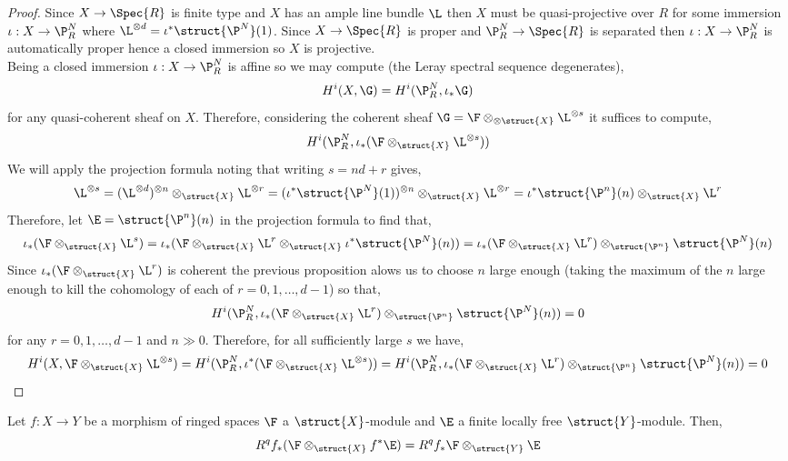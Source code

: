 \documentclass[12pt]{article}
\begin{document}
\begin{proof}
Since $X \to \Spec{R}$ is finite type and $X$ has an ample line bundle $\L$ then $X$ must be quasi-projective over $R$ for some immersion $\iota : X \to \P^N_R$ where $\L^{\otimes d} = \iota^* \struct{\P^N}(1)$. Since $X \to \Spec{R}$ is proper and $\P^N_R \to \Spec{R}$ is separated then $\iota : X \to \P^N_R$ is automatically proper hence a closed immersion so $X$ is projective. 
\bigskip\\
Being a closed immersion $\iota : X \to \P^N_R$ is affine so we may compute (the Leray spectral sequence degenerates),
\[ H^i(X, \G) = H^i(\P^N_R, \iota_* \G) \]
for any quasi-coherent sheaf on $X$. Therefore, considering the coherent sheaf $\G = \F \otimes_{\otimes{\struct{X}}} \L^{\otimes s}$ it suffices to compute,
\[ H^i(\P^N_R, \iota_* ( \F \otimes_{\struct{X}} \L^{\otimes s} ) ) \]
We will apply the projection formula noting that writing $s = nd + r$ gives,
\[ \L^{\otimes s} = (\L^{\otimes d})^{\otimes n} \otimes_{\struct{X}} \L^{\otimes r} = (\iota^* \struct{\P^N}(1))^{\otimes n} \otimes_{\struct{X}} \L^{\otimes r} = \iota^* \struct{\P^n}(n) \otimes_{\struct{X}} \L^{r} \]
Therefore, let $\E = \struct{\P^n}(n)$ in the projection formula to find that,
\[ \iota_* ( \F \otimes_{\struct{X}} \L^{s} ) = \iota_* (\F \otimes_{\struct{X}} \L^{r} \otimes_{\struct{X}} \iota^* \struct{\P^N}(n)) = \iota_* (\F \otimes_{\struct{X}} \L^{r}) \otimes_{\struct{\P^n}} \struct{\P^N}(n) \]
Since $\iota_* (\F \otimes_{\struct{X}} \L^{r})$ is coherent the previous proposition alows us to choose $n$ large enough (taking the maximum of the $n$ large enough to kill the cohomology of each of $r = 0, 1, \dots, d-1$) so that,
\[ H^i(\P^N_R, \iota_* (\F \otimes_{\struct{X}} \L^{r}) \otimes_{\struct{\P^n}} \struct{\P^N}(n))  = 0 \]
for any $r = 0, 1, \dots, d-1$ and $n \gg 0$.
Therefore, for all sufficiently large $s$ we have,
\[ H^i(X, \F \otimes_{\struct{X}} \L^{\otimes s}) = H^i(\P^N_R, \iota^* (\F \otimes_{\struct{X}} \L^{\otimes s})) = H^i(\P^N_R, \iota_* (\F \otimes_{\struct{X}} \L^{r}) \otimes_{\struct{\P^n}} \struct{\P^N}(n)) = 0 \]
\end{proof}

\begin{theorem}
Let $f : X \to Y$ be a morphism of ringed spaces $\F$ a $\struct{X}$-module and $\E$ a finite locally free $\struct{Y}$-module. Then,
\[ R^q f_* (\F \otimes_{\struct{X}} f^* \E) = R^q f_* \F \otimes_{\struct{Y}} \E \]
\end{theorem}
\end{document}
